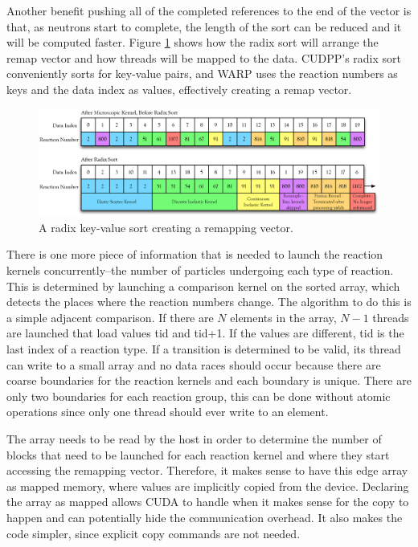 Another benefit pushing all of the completed references to the end of the vector is that, as neutrons start to complete, the length of the sort can be reduced and it will be computed faster.  Figure \ref{radix_sort} shows how the radix sort will arrange the remap vector and how threads will be mapped to the data.  CUDPP's radix sort conveniently sorts for key-value pairs, and WARP uses the reaction numbers as keys and the data index as values, effectively creating a remap vector.

\begin{figure}[h!] 
\centering
\includegraphics[width=1.0\textwidth]{graphics/radix_horiz.eps}
\caption{A radix key-value sort creating a remapping vector. \label{radix_sort} }
\end{figure}

There is one more piece of information that is needed to launch the reaction kernels concurrently--the number of particles undergoing each type of reaction.  This is determined by launching a comparison kernel on the sorted array, which detects the places where the reaction numbers change.  The algorithm to do this is a simple adjacent comparison.  If there are $N$ elements in the array, $N-1$ threads are launched that load values tid and tid+1.  If the values are different, tid is the last index of a reaction type. If a transition is determined to be valid, its thread can write to a small array and no data races should occur because there are coarse boundaries for the reaction kernels and each boundary is unique.  There are only two boundaries for each reaction group, this %
 can be done without atomic operations since only one thread should ever write to an element.  
 
The array %
needs to be read by the host in order to determine the number of blocks that need to be launched for each reaction kernel and where they%
 start accessing the remapping vector.  Therefore, it makes sense to have this edge array as mapped memory, where values are implicitly copied from the device.  Declaring the array as mapped allows CUDA to handle when it makes sense for the copy to happen and can potentially hide the communication overhead.  It also makes the code simpler, since explicit copy commands are not needed.  
 
